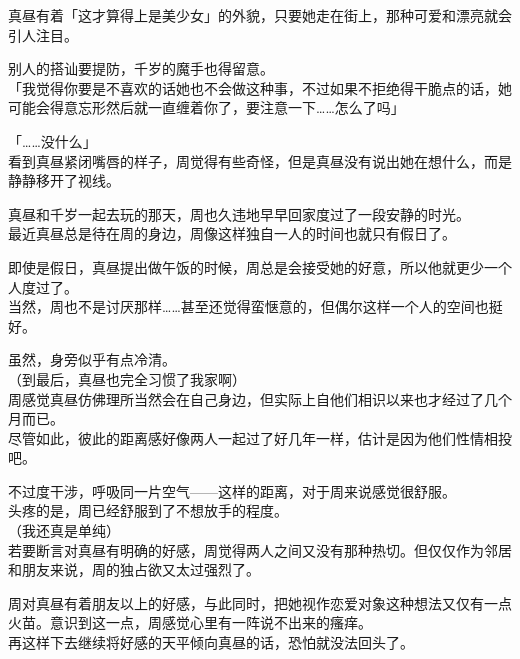 真昼有着「这才算得上是美少女」的外貌，只要她走在街上，那种可爱和漂亮就会引人注目。

别人的搭讪要提防，千岁的魔手也得留意。\\

「我觉得你要是不喜欢的话她也不会做这种事，不过如果不拒绝得干脆点的话，她可能会得意忘形然后就一直缠着你了，要注意一下……怎么了吗」

「……没什么」\\

看到真昼紧闭嘴唇的样子，周觉得有些奇怪，但是真昼没有说出她在想什么，而是静静移开了视线。\\

\vspace{2\baselineskip}

真昼和千岁一起去玩的那天，周也久违地早早回家度过了一段安静的时光。\\

最近真昼总是待在周的身边，周像这样独自一人的时间也就只有假日了。

即使是假日，真昼提出做午饭的时候，周总是会接受她的好意，所以他就更少一个人度过了。\\

当然，周也不是讨厌那样……甚至还觉得蛮惬意的，但偶尔这样一个人的空间也挺好。

虽然，身旁似乎有点冷清。\\

（到最后，真昼也完全习惯了我家啊）\\

周感觉真昼仿佛理所当然会在自己身边，但实际上自他们相识以来也才经过了几个月而已。\\

尽管如此，彼此的距离感好像两人一起过了好几年一样，估计是因为他们性情相投吧。

不过度干涉，呼吸同一片空气——这样的距离，对于周来说感觉很舒服。\\

头疼的是，周已经舒服到了不想放手的程度。\\

（我还真是单纯）\\

若要断言对真昼有明确的好感，周觉得两人之间又没有那种热切。但仅仅作为邻居和朋友来说，周的独占欲又太过强烈了。

周对真昼有着朋友以上的好感，与此同时，把她视作恋爱对象这种想法又仅有一点火苗。意识到这一点，周感觉心里有一阵说不出来的瘙痒。\\

再这样下去继续将好感的天平倾向真昼的话，恐怕就没法回头了。

